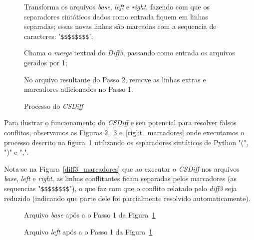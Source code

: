 \begin{figure}[ht]
	\begin{center}
		\begin{compactenum}[(1)]
            \item Transforma os arquivos \emph{base}, \emph{left} e
                \emph{right}, fazendo com que os separadores sintáticos dados
                como entrada fiquem em linhas separadas; essas novas linhas são
                marcadas com a sequencia de caracteres: '\verb|$$$$$$$$|';
            \item Chama o \emph{merge} textual do \emph{Diff3}, passando como
                entrada os arquivos gerados por 1;
            \item No arquivo resultante do Passo 2, remove as linhas extras e
                marcadores adicionados no Passo 1.
		\end{compactenum}
	\end{center}
	\caption{Processo do \emph{CSDiff}}\label{csdiff_process}
\end{figure}


Para ilustrar o funcionamento do \emph{CSDiff} e seu potencial para resolver
falsos conflitos, observamos as Figuras
\ref{base_marcadores},~\ref{left_marcadores} e~\ref{right_marcadores} onde
executamos o processo descrito na figura~\ref{csdiff_process} utilizando os
separadores sintáticos de Python "(", ")" e ",".

Nota-se na Figura~\ref{diff3_marcadores} que ao executar o \emph{CSDiff} nos
arquivos \emph{base}, \emph{left} e \emph{right}, as linhas conflitantes ficam
separadas pelos marcadores (as sequencias "\verb|$$$$$$$$|"), o que faz com que
o conflito relatado pelo \emph{diff3} seja reduzido (indicando que parte dele
foi parcialmente resolvido automaticamente).

\begin{figure}[ht]
	\begin{center}
        
        \caption{Arquivo \emph{base} após a o Passo 1 da
        Figura~\ref{csdiff_process}}\label{base_marcadores}
	\end{center}
\end{figure}

\begin{figure}[ht]
	\begin{center}
		
        \caption{Arquivo \emph{left} após a o Passo 1 da
        Figura~\ref{csdiff_process}}\label{left_marcadores}
	\end{center}
\end{figure}

